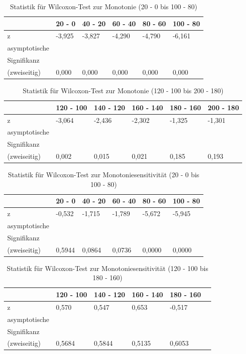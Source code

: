 \documentclass[a4paper]{thesis}
\begin{document}
\begin{table}[H]
\centering
\caption{Statistik für Wilcoxon-Test zur Monotonie (20 - 0 bis 100 - 80)}
\label{Statistik für Wilcoxon-Test zur Monotonie (20 - 0 bis 100 - 80)}
\begin{tabular}{l|l|l|l|l|l}
& 20 - 0 & 40 - 20 & 60 - 40 & 80 - 60 & 100 - 80\\
\hline
z & -3,925 & -3,827 & -4,290 & -4,790 & -6,161\\
\hline
asymptotische & & & & &\\
Signifikanz & & & & &\\
(zweiseitig) & 0,000 & 0,000 & 0,000 & 0,000 & 0,000
\end{tabular}
\end{table}

\begin{table}[H]
\centering
\caption{Statistik für Wilcoxon-Test zur Monotonie (120 - 100 bis 200 - 180)}
\label{Statistik für Wilcoxon-Test zur Monotonie (120 - 100 bis 200 - 180)}
\begin{tabular}{l|l|l|l|l|l}
& 120 - 100 & 140 - 120 & 160 - 140 & 180 - 160 & 200 - 180\\
\hline
z & -3,064 & -2,436 & -2,302 & -1,325 & -1,301\\
\hline
asymptotische & & & & &\\
Signifikanz & & & & &\\
(zweiseitig) & 0,002 & 0,015 & 0,021 & 0,185 & 0,193
\end{tabular}
\end{table}

\begin{table}[H]
\centering
\caption{Statistik für Wilcoxon-Test zur Monotoniesensitivität (20 - 0 bis 100 - 80)}
\label{Statistik für Wilcoxon-Test zur Monotoniesensitivität (20 - 0 bis 100 - 80)}
\begin{tabular}{l|l|l|l|l|l}
& 20 - 0 & 40 - 20 & 60 - 40 & 80 - 60 & 100 - 80\\
\hline
z & -0,532 & -1,715 & -1,789 & -5,672 & -5,945\\
\hline
asymptotische & & & & &\\
Signifikanz & & & & &\\
(zweiseitig) & 0,5944 & 0,0864 & 0,0736 & 0,0000 & 0,0000
\end{tabular}
\end{table}

\begin{table}[H]
\centering
\caption{Statistik für Wilcoxon-Test zur Monotoniesensitivität (120 - 100 bis 180 - 160)}
\label{Statistik für Wilcoxon-Test zur Monotoniesensitivität (120 - 100 bis 180 - 160)}
\begin{tabular}{l|l|l|l|l|l}
& 120 - 100 & 140 - 120 & 160 - 140 & 180 - 160\\
\hline
z & 0,570 & 0,547 & 0,653 & -0,517\\
\hline
asymptotische & & & & &\\
Signifikanz & & & & &\\
(zweiseitig) & 0,5684 & 0,5844 & 0,5135 & 0,6053
\end{tabular}
\end{table}
\end{document}
